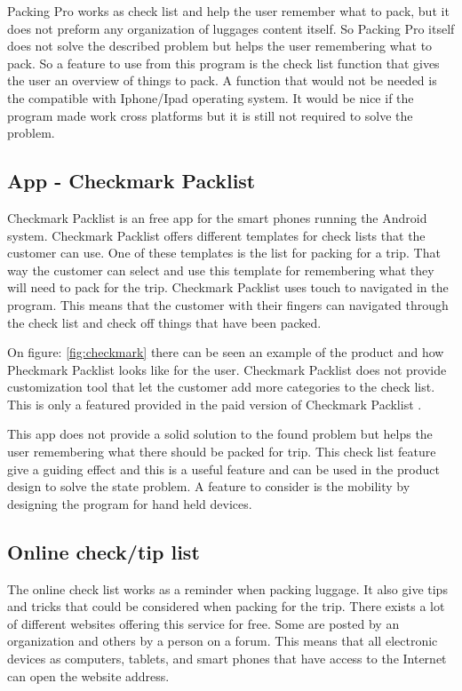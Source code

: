 Packing Pro works as check list and help the user remember what to pack, but it does not preform any organization of luggages content itself. So Packing Pro itself does not solve the described problem but helps the user remembering what to pack. So a feature to use from this program is the check list function that gives the user an overview of things to pack.
A function that would not be needed is the compatible with Iphone/Ipad operating system. It would be nice if the program made work cross platforms but it is still not required to solve the problem.

\subsection*{App - Checkmark Packlist}

Checkmark Packlist is an free app for the smart phones running the Android system.
Checkmark Packlist offers different templates for check lists that the customer can use. One of these templates is the list for packing for a trip. That way the customer can select and use this template for remembering what they will need to pack for the trip. Checkmark Packlist uses touch to navigated in the program. This means that the customer with their fingers can navigated through the check list and check off things that have been packed.


On figure: \ref{fig:checkmark} there can be seen an example of the product and how Pheckmark Packlist looks like for the user.
Checkmark Packlist does not provide customization tool that let the customer add more categories to the check list. This is only a featured provided in the paid version of Checkmark Packlist \citep{checkpacklist}.

This app does not provide a solid solution to the found problem but helps the user remembering what there should be packed for trip. This check list feature give a guiding effect and this is a useful feature and can be used in the product design to solve the state problem. A feature to consider is the mobility by designing the program for hand held devices.

\subsection*{Online check/tip list}

The online check list works as a reminder when packing luggage. It also give tips and tricks that could be considered when packing for the trip. There exists a lot of different websites offering this service for free. Some are posted by an organization and others by a person on a forum. This means that all electronic devices as computers, tablets, and smart phones that have access to the Internet can open the website address.

